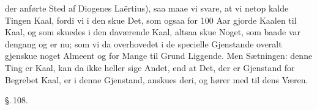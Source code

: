 \documentclass[12pt]{book}
\def\textit#1{#1}%
\def\emph#1{#1}%
\newcommand{\parag}[1]{%
  \par\vspace{0.9\baselineskip}%
  {\centering\textit{\S.\,#1.}\par}%
  \vspace{0.35\baselineskip}%
  \noindent\hspace{\parindent}\ignorespaces
}
\newcommand{\opage}[1]{\marginnote{\footnotesize\textit{[#1]}}}
\begin{document}
der anførte Sted af Diogenes La\"ertius), saa maae vi svare, at vi netop kalde Tingen Kaal,
fordi vi i den skue Det, som ogsaa for 100 Aar gjorde Kaalen til Kaal, og som skuedes i den
daværende Kaal, altsaa skue Noget, som baade var dengang og er nu; som vi da overhovedet i
de
\opage{263} specielle Gjenstande overalt gjenskue noget Almeent og for Mange til Grund Liggende. Men
Sætningen: denne Ting er Kaal, kan da ikke heller sige Andet, end at Det, der er Gjenstand
for Begrebet Kaal, er \emph{i} denne Gjenstand, anskues deri, og hører med til dens Væren.

\parag{108}
\end{document}

